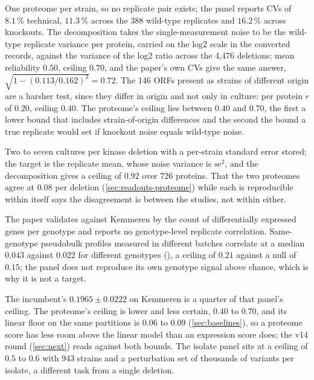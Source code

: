  One proteome per strain, so no replicate pair exists; the panel reports
CVs of $8.1\,\%$ technical, $11.3\,\%$ across the 388 wild-type replicates and
$16.2\,\%$ across knockouts. The decomposition takes the single-measurement noise to be
the wild-type replicate variance per protein, carried on the log2 scale in the converted
records, against the variance of the log2 ratio across the 4,476 deletions: mean
reliability $0.50$, ceiling $0.70$, and the paper's own CVs give the same answer,
$\sqrt{1 - (0.113 / 0.162)^2} = 0.72$. The 146 ORFs present as strains of different
origin are a harsher test, since they differ in origin and not only in culture: per
protein $r$ of $0.20$, ceiling $0.40$. The proteome's ceiling lies between $0.40$ and
$0.70$, the first a lower bound that includes strain-of-origin differences and the second
the bound a true replicate would set if knockout noise equals wild-type noise.

 Two to seven cultures per kinase deletion with a per-strain standard
error stored; the target is the replicate mean, whose noise variance is $\mathrm{se}^2$,
and the decomposition gives a ceiling of $0.92$ over 726 proteins. That the two proteomes
agree at $0.08$ per deletion (\cref{sec:readouts-proteome}) while each is reproducible
within itself says the disagreement is between the studies, not within either.

 The paper validates against Kemmeren by the count of
differentially expressed genes per genotype and reports no genotype-level replicate
correlation. Same-genotype pseudobulk profiles measured in different batches correlate at
a median $0.043$ against $0.022$ for different genotypes (),
a ceiling of $0.21$ against a null of $0.15$; the panel does not reproduce its own
genotype signal above chance, which is why it is not a target.

 The incumbent's $0.1965 \pm 0.0222$ on
Kemmeren is a quarter of that panel's ceiling. The proteome's ceiling is lower and less
certain, $0.40$ to $0.70$, and its linear floor on the same partitions is $0.06$ to
$0.09$ (\cref{sec:baselines}), so a proteome score has less room above the linear model
than an expression score does; the v14 round (\cref{sec:next}) reads against both bounds.
The isolate panel sits at a ceiling of $0.5$ to $0.6$ with 943 strains and a
perturbation set of thousands of variants per isolate, a different task from a single
deletion.

